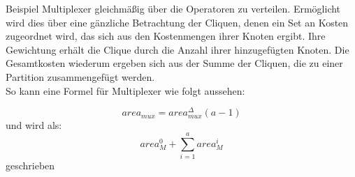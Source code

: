 \documentclass[conference]{IEEEtran}
\begin{document}
Beispiel Multiplexer gleichmäßig über die Operatoren zu
verteilen. \cite[S.247]{3}
Ermöglicht wird dies über eine gänzliche
Betrachtung der Cliquen, denen ein Set an Kosten zugeordnet
wird, das sich aus den Kostenmengen ihrer Knoten ergibt.
Ihre Gewichtung erhält die Clique durch die Anzahl ihrer
hinzugefügten Knoten. Die Gesamtkosten wiederum ergeben
sich aus der Summe der Cliquen, die zu einer Partition
zusammengefügt werden.\cite[S. 247]{3}\\
So kann eine Formel für Multiplexer wie folgt aussehen:\\
\begin{center}
\begin{equation}
area_{mux} = area_{mux}^{\Delta}(a-1) 
\end{equation}
und wird als:
\begin{equation}
area_{M}^{0} + \sum_{i=1}^{a}area_{M}^{i}
\end{equation}
 geschrieben\\  
 \cite[S. 247]{3}
\end{center}
\end{document}
